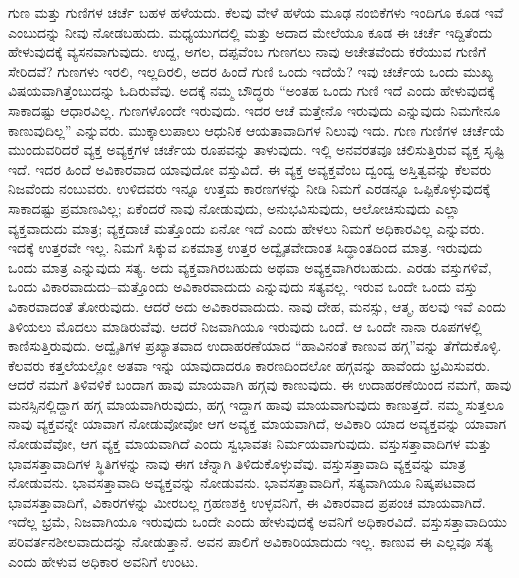 ಗುಣ ಮತ್ತು ಗುಣಿಗಳ ಚರ್ಚೆ ಬಹಳ ಹಳೆಯದು. ಕೆಲವು ವೇಳೆ ಹಳೆಯ ಮೂಢ ನಂಬಿಕೆಗಳು ಇಂದಿಗೂ ಕೂಡ ಇವೆ ಎಂಬುದನ್ನು ನೀವು ನೋಡಬಹುದು. ಮಧ್ಯಯುಗದಲ್ಲಿ ಮತ್ತು ಅದಾದ ಮೇಲೆಯೂ ಕೂಡ ಈ ಚರ್ಚೆ ಇದ್ದಿತೆಂದು ಹೇಳುವುದಕ್ಕೆ ವ್ಯಸನವಾಗುವುದು. ಉದ್ದ, ಅಗಲ, ದಪ್ಪವೆಂಬ ಗುಣಗಲು ನಾವು ಅಚೇತವೆಂದು ಕರೆಯುವ ಗುಣಿಗೆ ಸೇರಿದವೆ? ಗುಣಗಳು ಇರಲಿ, ಇಲ್ಲದಿರಲಿ, ಅದರ ಹಿಂದೆ ಗುಣಿ ಒಂದು ಇದೆಯೆ? ಇವು ಚರ್ಚೆಯ ಒಂದು ಮುಖ್ಯ ವಿಷಯವಾಗಿತ್ತೆಂಬುದನ್ನು ಓದಿರುವೆವು. ಅದಕ್ಕೆ ನಮ್ಮ ಬೌದ್ಧರು “ಅಂತಹ ಒಂದು ಗುಣಿ ಇದೆ ಎಂದು ಹೇಳುವುದಕ್ಕೆ ಸಾಕಾದಷ್ಟು ಆಧಾರವಿಲ್ಲ. ಗುಣಗಳೊಂದೇ ಇರುವುದು. ಇದರ ಆಚೆ ಮತ್ತೇನೊ ಇರುವುದು ಎನ್ನುವುದು ನಿಮಗೇನೂ ಕಾಣುವುದಿಲ್ಲ” ಎನ್ನುವರು. ಮುಕ್ಕಾಲುಪಾಲು ಆಧುನಿಕ ಆಯತಾವಾದಿಗಳ ನಿಲುವು ಇದು. ಗುಣ ಗುಣಿಗಳ ಚರ್ಚೆಯೆ ಮುಂದುವರಿದರೆ ವ್ಯಕ್ತ ಅವ್ಯಕ್ತಗಳ ಚರ್ಚೆಯ ರೂಪವನ್ನು ತಾಳುವುದು. ಇಲ್ಲಿ ಅನವರತವೂ ಚಲಿಸುತ್ತಿರುವ ವ್ಯಕ್ತ ಸೃಷ್ಟಿ ಇದೆ. ಇದರ ಹಿಂದೆ ಅವಿಕಾರವಾದ ಯಾವುದೋ ವಸ್ತುವಿದೆ. ಈ ವ್ಯಕ್ತ ಅವ್ಯಕ್ತವೆಂಬ ದ್ವಂದ್ವ ಅಸ್ತಿತ್ವವನ್ನು ಕೆಲವರು ನಿಜವೆಂದು ನಂಬುವರು. ಉಳಿದವರು ಇನ್ನೂ ಉತ್ತಮ ಕಾರಣಗಳನ್ನು ನೀಡಿ ನಿಮಗೆ ಎರಡನ್ನೂ ಒಪ್ಪಿಕೊಳ್ಳುವುದಕ್ಕೆ ಸಾಕಾದಷ್ಟು ಪ್ರಮಾಣವಿಲ್ಲ; ಏಕೆಂದರೆ ನಾವು ನೋಡುವುದು, ಅನುಭವಿಸುವುದು, ಆಲೋಚಿಸುವುದು ಎಲ್ಲಾ ವ್ಯಕ್ತವಾದುದು ಮಾತ್ರ; ವ್ಯಕ್ತದಾಚೆ ಮತ್ತೊಂದು ಏನೋ ಇದೆ ಎಂದು ಹೇಳಲು ನಿಮಗೆ ಅಧಿಕಾರವಿಲ್ಲ ಎನ್ನುವರು. ಇದಕ್ಕೆ ಉತ್ತರವೇ ಇಲ್ಲ. ನಿಮಗೆ ಸಿಕ್ಕುವ ಏಕಮಾತ್ರ ಉತ್ತರ ಅದ್ವೈತವೇದಾಂತ ಸಿದ್ಧಾಂತದಿಂದ ಮಾತ್ರ. ಇರುವುದು ಒಂದು ಮಾತ್ರ ಎನ್ನುವುದು ಸತ್ಯ. ಅದು ವ್ಯಕ್ತವಾಗಿರಬಹುದು ಅಥವಾ ಅವ್ಯಕ್ತವಾಗಿರಬಹುದು. ಎರಡು ವಸ್ತುಗಳಿವೆ, ಒಂದು ವಿಕಾರವಾದುದು–ಮತ್ತೊಂದು ಅವಿಕಾರವಾದುದು ಎನ್ನುವುದು ಸತ್ಯವಲ್ಲ. ಇರುವ ಒಂದೇ ಒಂದು ವಸ್ತು ವಿಕಾರವಾದಂತೆ ತೋರುವುದು. ಆದರೆ ಅದು ಅವಿಕಾರವಾದುದು. ನಾವು ದೇಹ, ಮನಸ್ಸು, ಆತ್ಮ, ಹಲವು ಇವೆ ಎಂದು ತಿಳಿಯಲು ಮೊದಲು ಮಾಡಿರುವೆವು. ಆದರೆ ನಿಜವಾಗಿಯೂ ಇರುವುದು ಒಂದೆ. ಆ ಒಂದೇ ನಾನಾ ರೂಪಗಳಲ್ಲಿ ಕಾಣಿಸುತ್ತಿರುವುದು. ಅದ್ವೈತಿಗಳ ಪ್ರಖ್ಯಾತವಾದ ಉದಾಹರಣೆಯಾದ “ಹಾವಿನಂತೆ ಕಾಣುವ ಹಗ್ಗ”ವನ್ನು ತೆಗೆದುಕೊಳ್ಳಿ. ಕೆಲವರು ಕತ್ತಲೆಯಲ್ಲೋ ಅತವಾ ಇನ್ನು ಯಾವುದಾದರೂ ಕಾರಣದಿಂದಲೋ ಹಗ್ಗವನ್ನು ಹಾವೆಂದು ಭ್ರಮಿಸುವರು. ಆದರೆ ನಮಗೆ ತಿಳಿವಳಿಕೆ ಬಂದಾಗ ಹಾವು ಮಾಯವಾಗಿ ಹಗ್ಗವು ಕಾಣುವುದು. ಈ ಉದಾಹರಣೆಯಿಂದ ನಮಗೆ, ಹಾವು ಮನಸ್ಸಿನಲ್ಲಿದ್ದಾಗ ಹಗ್ಗ ಮಾಯವಾಗಿರುವುದು, ಹಗ್ಗ ಇದ್ದಾಗ ಹಾವು ಮಾಯವಾಗುವುದು ಕಾಣುತ್ತದೆ. ನಮ್ಮ ಸುತ್ತಲೂ ನಾವು ವ್ಯಕ್ತವನ್ನೇ ಯಾವಾಗ ನೋಡುವೋವೋ ಆಗ ಅವ್ಯಕ್ತ ಮಾಯವಾಗಿದೆ, ಅವಿಕಾರಿ ಯಾದ ಅವ್ಯಕ್ತವನ್ನು ಯಾವಾಗ ನೋಡುವೆವೋ, ಆಗ ವ್ಯಕ್ತ ಮಾಯವಾಗಿದೆ ಎಂದು ಸ್ವಭಾವತಃ ನಿರ್ಮಯವಾಗುವುದು. ವಸ್ತುಸತ್ತಾವಾದಿಗಳ ಮತ್ತು ಭಾವಸತ್ತಾವಾದಿಗಳ ಸ್ಥಿತಿಗಳನ್ನು ನಾವು ಈಗ ಚೆನ್ನಾಗಿ ತಿಳಿದುಕೊಳ್ಳುವೆವು. ವಸ್ತುಸತ್ತಾವಾದಿ ವ್ಯಕ್ತವನ್ನು ಮಾತ್ರ ನೋಡುವನು. ಭಾವಸತ್ತಾವಾದಿ ಅವ್ಯಕ್ತವನ್ನು ನೋಡುವನು. ಭಾವಸತ್ತಾವಾದಿಗೆ, ಸತ್ಯವಾಗಿಯೂ ನಿಷ್ಕಪಟವಾದ ಭಾವಸತ್ತಾವಾದಿಗೆ, ವಿಕಾರಗಳನ್ನು ಮೀರಬಲ್ಲ ಗ್ರಹಣಶಕ್ತಿ ಉಳ್ಳವನಿಗೆ, ಈ ವಿಕಾರವಾದ ಪ್ರಪಂಚ ಮಾಯವಾಗಿದೆ. ಇದೆಲ್ಲ ಭ್ರಮೆ, ನಿಜವಾಗಿಯೂ ಇರುವುದು ಒಂದೇ ಎಂದು ಹೇಳುವುದಕ್ಕೆ ಅವನಿಗೆ ಅಧಿಕಾರವಿದೆ. ವಸ್ತುಸತ್ತಾವಾದಿಯು ಪರಿವರ್ತನಶೀಲವಾದುದನ್ನು ನೋಡುತ್ತಾನೆ. ಅವನ ಪಾಲಿಗೆ ಅವಿಕಾರಿಯಾದುದು ಇಲ್ಲ. ಕಾಣುವ ಈ ಎಲ್ಲವೂ ಸತ್ಯ ಎಂದು ಹೇಳುವ ಅಧಿಕಾರ ಅವನಿಗೆ ಉಂಟು. 

\vskip 0.2cm

